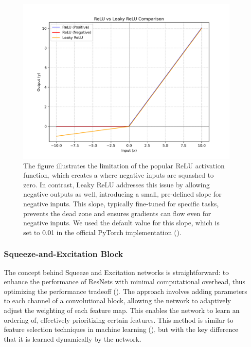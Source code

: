         \begin{figure}[htbp]
            \centering
            \includegraphics[width=0.6\linewidth]{images/methods_mono/leaky_relu/leaky_relu.png}
            \captionsetup{justification=justified, singlelinecheck=false, width=1\linewidth, labelfont=bf} 
            \caption[]{The figure illustrates the limitation of the popular ReLU activation function, which creates a  where negative inputs are squashed to zero. In contrast, Leaky ReLU addresses this issue by allowing negative outputs as well, introducing a small, pre-defined slope for negative inputs. This slope, typically fine-tuned for specific tasks, prevents the dead zone and ensures gradients can flow even for negative inputs. We used the default value for this slope, which is set to 0.01 in the official PyTorch implementation (\cite{pytorchinit}).}
            \label{fig:leaky-relu}
        \end{figure}

    \subsubsection{Squeeze-and-Excitation Block} \label{subsec:se}

        \noindent The concept behind Squeeze and Excitation networks is straightforward: to enhance the performance of ResNets with minimal computational overhead, thus optimizing the performance tradeoff (\textcolor{deepblue}{\cite{hu2017squeezeandexcitation}}). The approach involves adding parameters to each channel of a convolutional block, allowing the network to adaptively adjust the weighting of each feature map. This enables the network to learn an ordering of, effectively prioritizing certain features. This method is similar to feature selection techniques in machine learning (\textcolor{deepblue}{\cite{FeatureSelection}}), but with the key difference that it is learned dynamically by the network.
        
